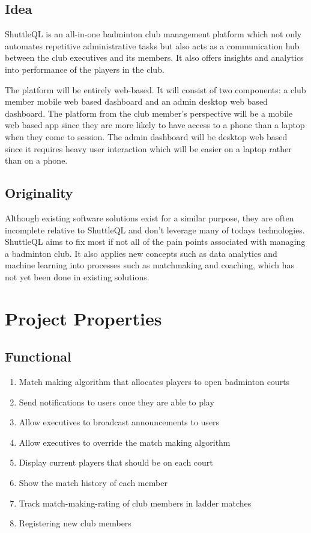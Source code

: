 \documentclass{article}
\begin{document}
\subsection{Idea}
ShuttleQL is an all-in-one badminton club management platform which not only
automates repetitive administrative tasks but also acts as a communication hub
between the club executives and its members. It also offers insights and
analytics into performance of the players in the club.

The platform will be entirely web-based. It will consist of two components:
a club member mobile web based dashboard and an admin desktop web based dashboard.
The platform from the club member's perspective will be a mobile web based app
since they are more likely to have access to a phone than a laptop when they
come to session. The admin dashboard will be desktop web based since it requires
heavy user interaction which will be easier on a laptop rather than on a phone.

\subsection{Originality}
Although existing software solutions exist for a similar purpose, they are often
incomplete relative to ShuttleQL and don't leverage many of todays technologies.
ShuttleQL aims to fix most if not all of the pain points associated with
managing a badminton club. It also applies new concepts such as data analytics and
machine learning into processes such as matchmaking and coaching, which has not
yet been done in existing solutions.

\newpage

\section{Project Properties}
\subsection{Functional}
\begin{enumerate}
  \item Match making algorithm that allocates players to open badminton courts
  \item Send notifications to users once they are able to play
  \item Allow executives to broadcast announcements to users
  \item Allow executives to override the match making algorithm
  \item Display current players that should be on each court
  \item Show the match history of each member
  \item Track match-making-rating of club members in ladder matches
  \item Registering new club members
\end{enumerate}
\end{document}
